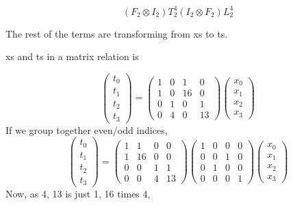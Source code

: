 \documentclass{article}
\begin{document}
	\begin{equation}
		(F_2 \otimes I_2)T_2^4(I_2 \otimes F_2)L_2^4
	\end{equation}

	The rest of the terms are transforming from xs to ts.
	
	xs and ts in a matrix relation is
	
	\begin{equation}
		\begin{pmatrix}
			t_0 \\
			t_1 \\
			t_2 \\
			t_3
		\end{pmatrix}
		= 
		\begin{pmatrix}
			1 & 0 & 1 & 0 \\
			1 & 0 & 16 & 0 \\
			0 & 1 & 0 & 1 \\
			0 & 4 & 0 & 13
		\end{pmatrix}
	\begin{pmatrix}
		x_0 \\
		x_1 \\
		x_2 \\
		x_3
	\end{pmatrix}
	\end{equation}
	If we group together even/odd indices,
	\begin{equation}
		\begin{pmatrix}
			t_0 \\
			t_1 \\
			t_2 \\
			t_3
		\end{pmatrix}
		= 
		\begin{pmatrix}
			1 & 1 & 0 & 0 \\
			1 & 16 & 0 & 0 \\
			0 & 0 & 1 & 1 \\
			0 & 0 & 4 & 13
		\end{pmatrix}
		\begin{pmatrix}
			1 & 0 & 0 & 0 \\
			0 & 0 & 1 & 0 \\
			0 & 1 & 0 & 0 \\
			0 & 0 & 0 & 1
		\end{pmatrix}
		\begin{pmatrix}
			x_0 \\
			x_1 \\
			x_2 \\
			x_3
		\end{pmatrix}
	\end{equation}
	Now, as 4, 13 is just 1, 16 times 4,
	
\end{document}
